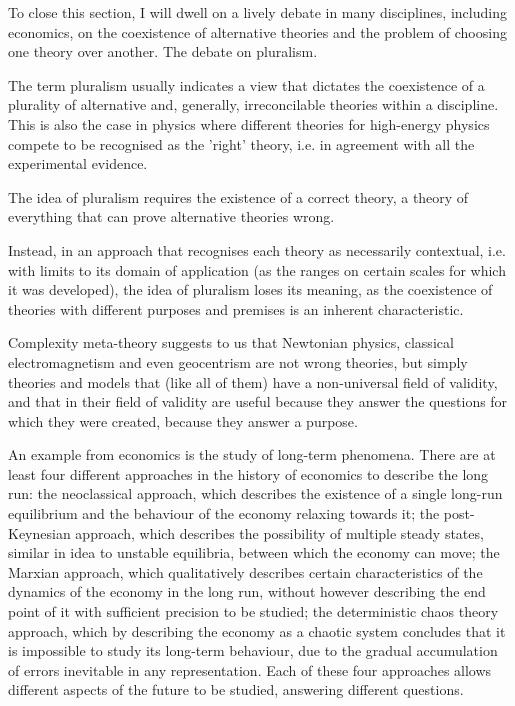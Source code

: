 \documentclass[a4paper, headings=standardclasses]{scrartcl}
\begin{document}
To close this section, I will dwell on a lively debate in many disciplines, including economics, on the coexistence of alternative theories and the problem of choosing one theory over another. The debate on pluralism. 

The term pluralism usually indicates a view that dictates the coexistence of a plurality of alternative and, generally, irreconcilable theories within a discipline. 
This is also the case in physics where different theories for high-energy physics compete to be recognised as the 'right' theory, i.e. in agreement with all the experimental evidence.

The idea of pluralism requires the existence of a correct theory, a theory of everything that can prove alternative theories wrong.

Instead, in an approach that recognises each theory as necessarily contextual, i.e. with limits to its domain of application (as the ranges on certain scales for which it was developed), the idea of pluralism loses its meaning, as the coexistence of theories with different purposes and premises is an inherent characteristic.

Complexity meta-theory suggests to us that Newtonian physics, classical electromagnetism and even geocentrism are not wrong theories, but simply theories and models that (like all of them) have a non-universal field of validity, and that in their field of validity are useful because they answer the questions for which they were created, because they answer a purpose.

An example from economics is the study of long-term phenomena.
There are at least four different approaches in the history of economics to describe the long run: the neoclassical approach, which describes the existence of a single long-run equilibrium and the behaviour of the economy relaxing towards it; the post-Keynesian approach, which describes the possibility of multiple steady states, similar in idea to unstable equilibria, between which the economy can move; the Marxian approach, which qualitatively describes certain characteristics of the dynamics of the economy in the long run, without however describing the end point of it with sufficient precision to be studied; the deterministic chaos theory approach, which by describing the economy as a chaotic system concludes that it is impossible to study its long-term behaviour, due to the gradual accumulation of errors inevitable in any representation.
Each of these four approaches allows different aspects of the future to be studied, answering different questions.
\end{document}
